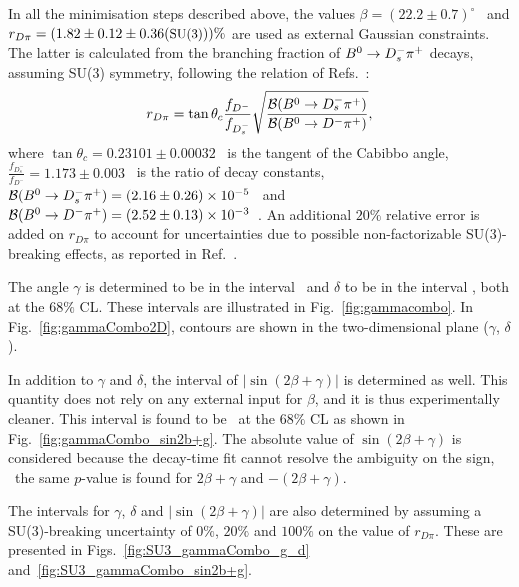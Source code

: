 In all the minimisation steps described above, the values $\beta=(22.2 \pm 0.7)^{\circ}$~\cite{HFAG} and
$r_{D\pi}=(1.82 \pm 0.12 \pm 0.36(\textrm{\small{SU(3)}}))\%$ are used as external Gaussian constraints. 
The latter is calculated from the branching fraction
of $B^0 \rightarrow D^-_s \pi^+$ decays, assuming SU(3) symmetry, following the relation of Refs.~\cite{Das:2010be,Aubert:2008zi}:
\begin{equation}
\label{eq:rdpi_1}
r_{D\pi}= \tan \theta_c  \frac{f_{D^-}}{f_{D^-_s}}\sqrt{\frac{\mathcal{B}(B^0 \rightarrow D^-_s \pi^+)}{\mathcal{B}(B^0 \rightarrow D^- \pi^+)}},
\end{equation}
where $ \tan \theta_c= 0.23101 \pm 0.00032$~\cite{CKMfitter2015} is the tangent of the Cabibbo angle,
$\frac{f_{D^-_s}}{f_{D^-}}= 1.173 \pm 0.003$~\cite{Aoki:2016frl,Bazavov:2014wgs,Carrasco:2014poa} is the ratio of decay constants,
$\mathcal{B}(B^0 \rightarrow D^-_s \pi^+)=(2.16 \pm 0.26)\times10^{-5}$~\cite{PDG} and $\mathcal{B}(B^0 \rightarrow D^- \pi^+)=(2.52 \pm 0.13)\times10^{-3}$~\cite{PDG}.
 An additional $20\%$ relative error is added on $r_{D\pi}$ to account for
uncertainties due to  possible non-factorizable SU(3)-breaking effects, as reported in Ref.~\cite{DeBruyn:2012jp}.

The angle $\gamma$ is determined to be in the interval \gammaCL~and $\delta$ to be in the interval \deltaCL, both at the $68\%$ CL. These intervals are illustrated in Fig.~\ref{fig:gammacombo}.
In Fig.~\ref{fig:gammaCombo2D}, contours are shown in the two-dimensional plane ($\gamma$, $\delta$). 

In addition to $\gamma$ and $\delta$, the interval
of $|\sin(2\beta +\gamma)|$ is determined as well. This quantity does not rely on any external input for $\beta$, and it is thus experimentally
cleaner. This interval is found
to be \magSinTwoBplusGCL~at the $68\%$ CL as shown in Fig.~\ref{fig:gammaCombo_sin2b+g}.
The absolute value of $\sin(2\beta +\gamma)$ is considered because the decay-time fit cannot resolve the ambiguity on the sign, \ie~the 
same $p$-value is found for $2\beta +\gamma$ and $-(2\beta +\gamma)$. 

The intervals for $\gamma$, $\delta$ and $|\sin(2\beta +\gamma)|$ are also determined by assuming a SU(3)-breaking uncertainty of $0\%$, $20\%$ and $100\%$
on the value of $r_{D\pi}$. These are presented in
Figs.~\ref{fig:SU3_gammaCombo_g_d} and~\ref{fig:SU3_gammaCombo_sin2b+g}.

